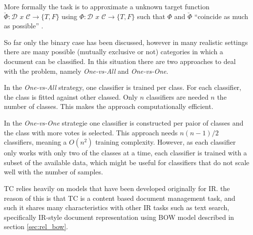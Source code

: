 More formally the task is to approximate a unknown target function 
 $\breve{\Phi}:\mathcal{D}\,\, x\,\mathcal{\, C}\rightarrow\{T,F\}$  using 
 $\Phi:\mathcal{D}\,\, x\,\mathcal{\, C}\rightarrow\{T,F\}$  such that 
 $\Phi$ and  $\breve{\Phi}$ ``coincide as much as possible'' \cite{Sebastiani02}. 

So far only the binary case has been discussed, however in many realistic
settings there are many possible (mutually exclusive or not) categories in
which a document can be classified. In this situation there are two approaches
to deal with the problem, namely \textit{One-vs-All} and \textit{One-vs-One}. 

In the \textit{One-vs-All} strategy, one classifier is trained per class. For
each classifier, the class is fitted against other classed. Only $n$ 
classifiers are needed $n$ the number of classes. This makes the approach computationally efficient.

In the \textit{One-vs-One} strategie  one classifier is constructed per paior
of classes and the class with more votes is selected. This approach needs
$n(n-1)/2$ classifiers, meaning a $O(n^2)$ training complexity. However,  as
each classifier only works with only two of the classes at a time, each
classifier is trained with a subset of the available data, which might be useful for
classifiers that do not scale well with the number of samples.



\ac{TC} relies  heavily on  models that have been developed originally for \ac{IR}.
 the reason of this is that \ac{TC} is a content based document management task,
 and such it shares many characteristics with other IR tasks such as text
 search, specifically \ac{IR}-style document representation  using \ac{BOW} model described in section \ref{sec:rel_bow}.



